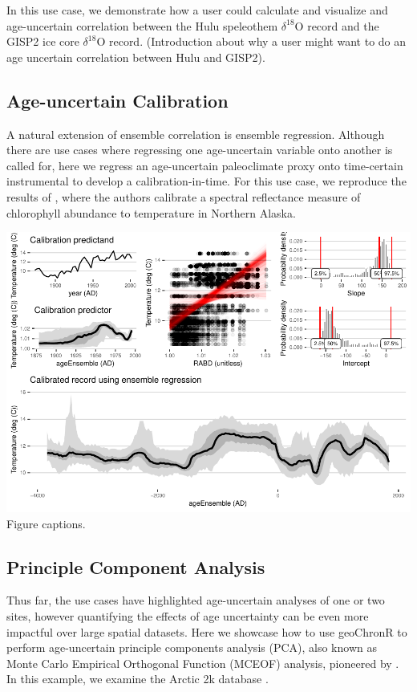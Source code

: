 \documentclass[gc, manuscript]{copernicus}
\begin{document}
In this use case, we demonstrate how a user could calculate and visualize and age-uncertain correlation between the Hulu speleothem \(\delta^{18}\mathrm{O}\) record and the GISP2 ice core \(\delta^{18}\mathrm{O}\) record. (Introduction about why a user might want to do an age uncertain correlation between Hulu and GISP2).

\subsection{Age-uncertain Calibration}

A natural extension of ensemble correlation is ensemble regression.
Although there are use cases where regressing one age-uncertain variable onto another is called for, here we regress an age-uncertain paleoclimate proxy onto time-certain instrumental to develop a calibration-in-time.
For this use case, we reproduce the results of \citet{Boldt:2015}, where the authors calibrate a spectral reflectance measure of chlorophyll abundance to temperature in Northern Alaska.

\includegraphics{geoChronR-paper_files/figure-latex/unnamed-chunk-9-1.pdf}
Figure captions.

\subsection{Principle Component Analysis}

Thus far, the use cases have highlighted age-uncertain analyses of one or two sites, however quantifying the effects of age uncertainty can be even more impactful over large spatial datasets.
Here we showcase how to use geoChronR to perform age-uncertain principle components analysis (PCA), also known as Monte Carlo Empirical Orthogonal Function (MCEOF) analysis, pioneered by \citet{anchukaitis2013mceof}.
In this example, we examine the Arctic 2k database \citep{McKayKaufman2014McKayKaufman2014}.
\end{document}

